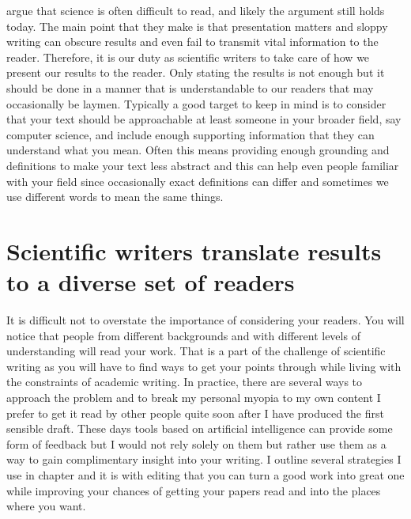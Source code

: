 \citet{gopen1990science} argue that science is often difficult to read, and likely the argument still holds today.
The main point that they make is that presentation matters and sloppy writing can obscure results and even fail to transmit vital information to the reader.
Therefore, it is our duty as scientific writers to take care of how we present our results to the reader.
Only stating the results is not enough but it should be done in a manner that is understandable to our readers that may occasionally be laymen.
Typically a good target to keep in mind is to consider that your text should be approachable at least someone in your broader field, say computer science, and include enough supporting information that they can understand what you mean.
Often this means providing enough grounding and definitions to make your text less abstract and this can help even people familiar with your field since occasionally exact definitions can differ and sometimes we use different words to mean the same things.

\section{Scientific writers translate results to a diverse set of readers}

It is difficult not to overstate the importance of considering your readers.
You will notice that people from different backgrounds and with different levels of understanding will read your work.
That is a part of the challenge of scientific writing as you will have to find ways to get your points through while living with the constraints of academic writing.
In practice, there are several ways to approach the problem and to break my personal myopia to my own content I prefer to get it read by other people quite soon after I have produced the first sensible draft.
These days tools based on artificial intelligence can provide some form of feedback but I would not rely solely on them but rather use them as a way to gain complimentary insight into your writing.
I outline several strategies I use in chapter  and it is with editing that you can turn a good work into great one while improving your chances of getting your papers read and into the places where you want.


